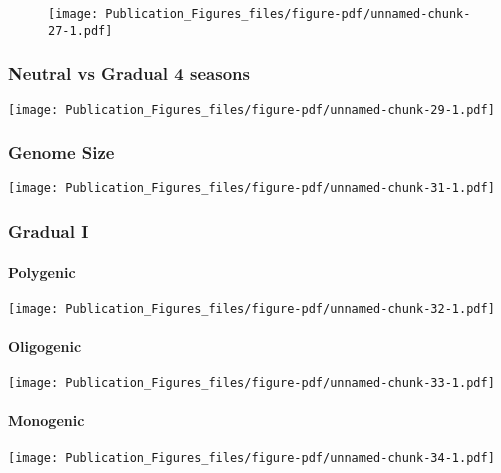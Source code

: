 \documentclass[
  letterpaper,
  DIV=11,
  numbers=noendperiod]{scrartcl}
\begin{document}
\begin{figure}[H]

{\centering \texttt{[image: Publication\_Figures\_files/figure-pdf/unnamed-chunk-27-1.pdf]}

}

\end{figure}

\hypertarget{neutral-vs-gradual-4-seasons}{%
\subsubsection{Neutral vs Gradual 4
seasons}\label{neutral-vs-gradual-4-seasons}}

\texttt{[image: Publication\_Figures\_files/figure-pdf/unnamed-chunk-29-1.pdf]}

\hypertarget{genome-size}{%
\subsubsection{Genome Size}\label{genome-size}}

\texttt{[image: Publication\_Figures\_files/figure-pdf/unnamed-chunk-31-1.pdf]}

\hypertarget{gradual-i}{%
\subsubsection{Gradual I}\label{gradual-i}}

\hypertarget{polygenic}{%
\paragraph{Polygenic}\label{polygenic}}

\texttt{[image: Publication\_Figures\_files/figure-pdf/unnamed-chunk-32-1.pdf]}

\hypertarget{oligogenic}{%
\paragraph{Oligogenic}\label{oligogenic}}

\texttt{[image: Publication\_Figures\_files/figure-pdf/unnamed-chunk-33-1.pdf]}

\hypertarget{monogenic}{%
\paragraph{Monogenic}\label{monogenic}}

\texttt{[image: Publication\_Figures\_files/figure-pdf/unnamed-chunk-34-1.pdf]}
\end{document}
